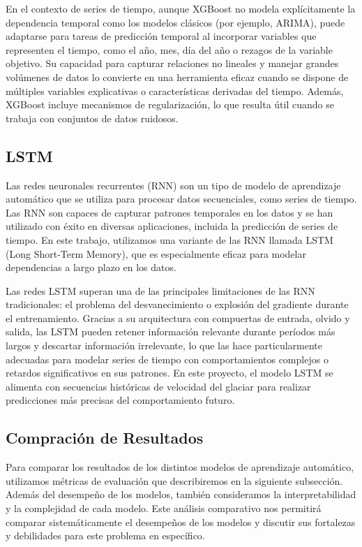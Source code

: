 \documentclass[sigconf,language=spanish]{acmart}
\begin{document}
En el contexto de series de tiempo, aunque XGBoost no modela explícitamente la dependencia temporal como los modelos clásicos (por ejemplo, ARIMA), puede adaptarse para tareas de 
predicción temporal al incorporar variables que representen el tiempo, como el año, mes, día del año o rezagos de la variable objetivo. Su capacidad para capturar relaciones no lineales
 y manejar grandes volúmenes de datos lo convierte en una herramienta eficaz cuando se dispone de múltiples variables explicativas o características derivadas del tiempo. Además, XGBoost
incluye mecanismos de regularización, lo que resulta útil cuando se trabaja con conjuntos de datos ruidosos.


\subsection{LSTM}

Las redes neuronales recurrentes (RNN) son un tipo de modelo de aprendizaje automático que se utiliza para procesar datos secuenciales, como series de tiempo.
Las RNN son capaces de capturar patrones temporales en los datos y se han utilizado con éxito en diversas aplicaciones, incluida la predicción de series de tiempo.
En este trabajo, utilizamos una variante de las RNN llamada LSTM (Long Short-Term Memory), que es especialmente eficaz para modelar dependencias a largo plazo en los datos.

Las redes LSTM superan una de las principales limitaciones de las RNN tradicionales: el problema del desvanecimiento o explosión del gradiente durante el entrenamiento.
 Gracias a su arquitectura con compuertas de entrada, olvido y salida, las LSTM pueden retener información relevante durante períodos más largos y descartar información 
 irrelevante, lo que las hace particularmente adecuadas para modelar series de tiempo con comportamientos complejos o retardos significativos en sus patrones. En este proyecto,
  el modelo LSTM se alimenta con secuencias históricas de velocidad del glaciar para realizar predicciones más precisas del comportamiento futuro.

\subsection{Compración de Resultados}

Para comparar los resultados de los distintos modelos de aprendizaje automático, utilizamos métricas de evaluación que 
describiremos en la siguiente subsección.
Además del desempeño de los modelos, también consideramos la interpretabilidad y la complejidad de cada modelo.
Este análisis comparativo nos permitirá comparar sistemáticamente
el desempeños de los modelos y discutir sus fortalezas y debilidades para este problema en específico.
\end{document}

